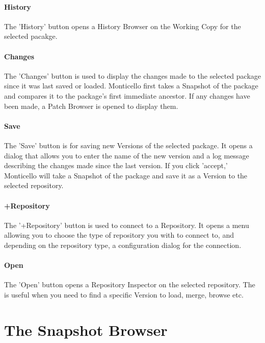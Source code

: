 \documentclass[a4paper,10pt,twoside]{book}
\begin{document}
\paragraph{History}

The 'History' button opens a History Browser on the Working Copy for the selected pacakge.

\paragraph{Changes}

The 'Changes' button is used to display the changes made to the selected package since it was last saved or loaded. Monticello first takes a Snapshot of the package and compares it to the package's first immediate ancestor. If any changes have been made, a Patch Browser is opened to display them.

\paragraph{Save}

The 'Save' button is for saving new Versions of the selected package. It opens a dialog that allows you to enter the name of the new version and a log message describing the changes made since the last version. If you click 'accept,' Monticello will take a Snapshot of the package and save it as a Version to the selected repository.

\paragraph{+Repository}

The '+Repository' button is used to connect to a Repository. It opens a menu allowing you to choose the type of repository you with to connect to, and depending on the repository type, a configuration dialog for the connection.

\paragraph{Open}

The 'Open' button opens a Repository Inspector on the selected repository. The is useful when you need to find a specific Version to load, merge, browse etc.

\section{The Snapshot Browser}
\end{document}
